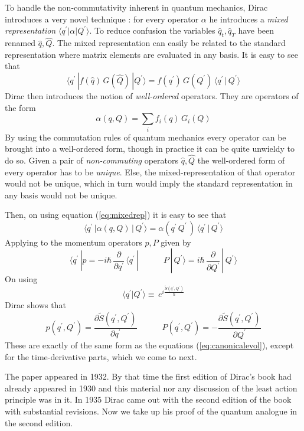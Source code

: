 \documentclass[12pt]{article}
\newcommand{\be}{\begin{equation}}
\newcommand{\ee}{\end{equation}}
\begin{document}
To handle the non-commutativity inherent in quantum mechanics, Dirac introduces a very novel technique \cite{diracpaper}: for every operator
$\alpha$ he introduces a {\it mixed representation} $\langle q^\prime|\alpha|Q^\prime\rangle$. To reduce confusion the variables 
${\hat q}_t, {\hat q}_T$
have been renamed ${\hat q},{\hat Q}$. The mixed representation can easily be related to the standard representation where matrix elements 
are evaluated 
in any basis. It is easy to see that
\be
\label{eq:mixedrep}
\langle q^\prime\,|f({\hat q})\,G({\hat Q})\,|Q^\prime \rangle  = f(q^\prime)\,G(Q^\prime)\,\langle q^\prime\,|\,Q^\prime\rangle
\ee
Dirac then introduces the notion of {\it well-ordered} operators. They are operators of the form 
\be
\label{eq:wellordered}
\alpha(q,Q) = \sum_i f_i(q)\,G_i(Q)
\ee
By using the commutation rules of quantum mechanics every operator can be brought into a well-ordered form, though in practice it can be
quite unwieldy to do so. Given a pair of \emph{non-commuting} operators ${\hat q}, {\hat Q}$ the well-ordered form of every operator has
to be \emph{unique}. Else, the mixed-representation of that operator would not be unique, which in turn would imply the standard representation
in any basis would not be unique.

Then, on using equation (\ref{eq:mixedrep}) it is easy to see that
\be
\label{eq:mixedrep2}
\langle q^\prime\,|\alpha(q,Q)\,|\,Q^\prime \rangle  = \alpha(q^\prime\,Q^\prime\,)\,\langle q^\prime\,|\,Q^\prime \rangle 
\ee
Applying to the momentum operators $p,P$ given by
\be
\label{eq:momenta}
\langle q^\prime\,|p = - i\hbar\,\frac{\partial}{\partial q^\prime}\,\langle q^\prime\,|\quad\quad\quad
P\,|\,Q^\prime\rangle = i\hbar\,\frac{\partial}{\partial Q^\prime}\,|\,Q^\prime\rangle
\ee
On using
\be
\langle q^\prime|Q^\prime \rangle \equiv\,e^{i \frac{{\tilde S}(q^\prime,Q^\prime)}{\hbar}}
\ee
Dirac shows that
\be
\label{eq:qanalog2}
p(q^\prime,Q^\prime) = \frac{\partial {\tilde S}(q^\prime,Q^\prime)}{\partial q^\prime}\quad\quad\quad
P(q^\prime,Q^\prime) = - \frac{\partial {\tilde S}(q^\prime,Q^\prime)}{\partial Q^\prime}
\ee
These are exactly of the same form as the equations (\ref{eq:canonicalevol}), except for the time-derivative parts, which we come to next.

The paper \cite{diracpaper} appeared in 1932. By that time the first edition of Dirac's book \cite{diracbook1} had already
appeared in 1930 and this material nor any discussion of the least action principle was in it. In 1935 Dirac came out with the second edition
of the book \cite{diracbook2} with substantial revisions. Now we take up his proof of the quantum analogue in the second edition.
\end{document}
